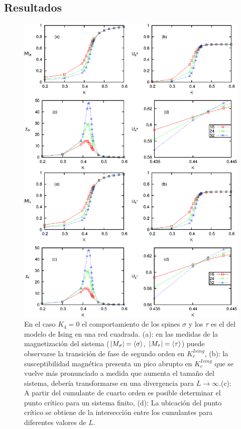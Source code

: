 \subsection{Resultados}
\label{sec:results_AT}

\begin{figure}[ht!]
\begin{center}
\includegraphics[scale=0.8]{graf/phases/multi_ising_sigma_tau_inkscape.eps}
\end{center}
\caption{En el caso $K_{4}=0$ el comportamiento de los spines $\sigma$ y los $\tau$ es el del modelo de Ising en una red cuadrada.
 (a): en las medidas de la magnetización del sistema ($|M_{\sigma}|=\langle \sigma \rangle$, $|M_{\tau}|=\langle \tau \rangle$) puede observarse la transici\'on de fase de segundo orden en $K_{c}^{Ising}$,
 (b): la susceptibilidad magn\'etica presenta un pico abrupto en $K_{c}^{Ising}$ que se vuelve m\'as pronunciado a medida que
 aumenta el tamaño del sistema, deber\'ia transformarse en una divergencia para $L\rightarrow \infty$.(c): A partir
 del cumulante de cuarto orden es posible determinar el punto cr\'itico para un sistema finito, (d): La ubicaci\'on del
 punto cr\'itico se obtiene de la intersecci\'on entre los cumulantes para diferentes valores de $L$.}
\label{fig:multi_ising_sigma_tau}
\end{figure}

